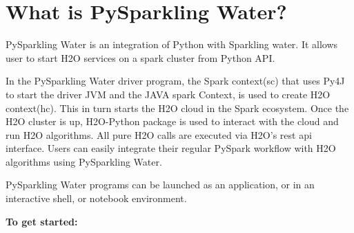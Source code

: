 \section{What is PySparkling Water?}

PySparkling Water is an integration of Python with Sparkling water. It allows user to start H2O services on a spark cluster from Python API.

In the PySparkling Water driver program, the Spark context(sc) that uses Py4J to start the driver JVM and the JAVA spark Context, is used to create H2O context(hc).  This in turn starts the H2O cloud in the Spark ecosystem. Once the H2O cluster is up, H2O-Python package is used to interact with the cloud and run H2O algorithms. All pure H2O calls are executed via H2O's rest api interface. Users can easily integrate their regular PySpark workflow with H2O algorithms using PySparkling Water.

PySparkling Water programs can be launched as an application, or in an interactive shell, or notebook environment.

\textbf{To get started:}

